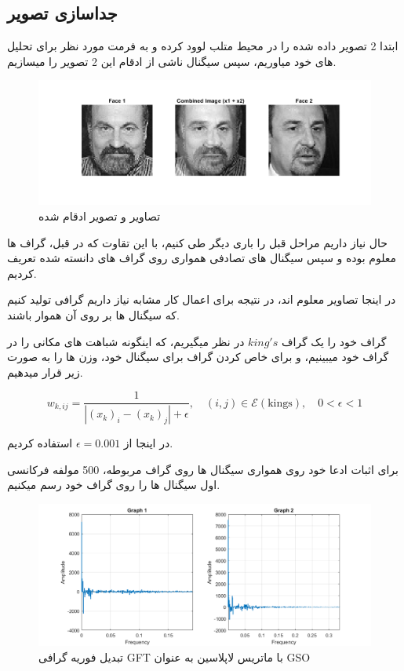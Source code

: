 \subsection{جداسازی تصویر}

ابتدا 2 تصویر داده شده را در محیط متلب لوود کرده و به فرمت مورد نظر برای تحلیل های خود میاوریم، سپس سیگنال ناشی از ادقام این 2 تصویر را میسازیم.

\vfil

\begin{figure}[h]
	\centering
	\includegraphics*[width=\linewidth]{../results/faces.png}
	\caption{تصاویر و تصویر ادقام شده}
\end{figure}

حال نیاز داریم مراحل قبل را باری دیگر طی کنیم، با این تقاوت که در قبل، گراف ها معلوم بوده و سپس سیگنال های تصادفی همواری روی گراف های
دانسته شده تعریف کردیم.

در اینجا تصاویر معلوم اند، در نتیجه برای اعمال کار مشابه نیاز داریم گرافی تولید کنیم که سیگنال ها بر روی آن هموار باشند.

\clearpage

گراف خود را یک گراف $king's$ در نظر میگیریم، که اینگونه شباهت های مکانی را در گراف خود میبینیم، و برای خاص کردن گراف برای سیگنال خود،
وزن ها را به صورت زیر قرار میدهیم.

\[
	w_{k, ij}=\frac{1}{|(x_k)_i-(x_k)_j|+\epsilon},\quad (i, j)\in\mathcal{E}(\text{kings}),\quad 0<\epsilon<1
\]

در اینجا از $\epsilon=0.001$ استفاده کردیم.

برای اثبات ادعا خود روی همواری سیگنال ها روی گراف مربوطه، 500 مولفه فرکانسی اول سیگنال ها را روی گراف خود رسم میکنیم.

\begin{figure}[h]
	\centering
	\includegraphics*[width=0.9\linewidth]{../results/gft_smoothness.png}
	\caption{تبدیل فوریه گرافی GFT با ماتریس لاپلاسین به عنوان GSO}
\end{figure}

